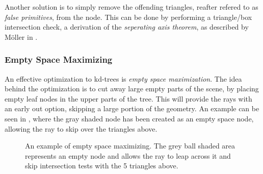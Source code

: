 Another solution is to simply remove the offending triangles, reafter
refered to as \textit{false primitives}, from the node. This can be
done by performing a triangle/box intersection check, a derivation of
the \textit{seperating axis theorem}, as described by Möller in
.


\subsubsection{Empty Space Maximizing}

An effective optimization to kd-trees is \textit{empty space
  maximization}. The idea behind the optimization is to cut away large
empty parts of the scene, by placing empty leaf nodes in the upper
parts of the tree. This will provide the rays with an early out
option, skipping a large portion of the geometry. An example can be
seen in , where the gray shaded node has
been created as an empty space node, allowing the ray to skip over the
triangles above.

\begin{figure}
  \centering

  \vspace{3mm}
  \parbox{6cm}{\caption[Empty space maximization.]{An example of empty
      space maximizing. The grey ball shaded area represents an empty
      node and allows the ray to leap across it and skip intersection
      tests with the 5 triangles above.}\label{fig:emptySpaceExample}}
\end{figure}


